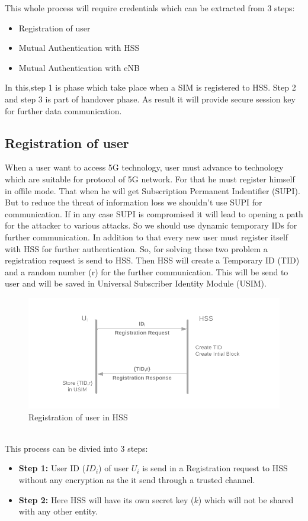 {    This whole process will require credentials which can be extracted from 3 steps:
    \begin{itemize}
        \item Registration of user
        \item Mutual Authentication with HSS
        \item Mutual Authentication with eNB
    \end{itemize}
    In this,step 1 is phase which take place when a SIM is registered to HSS.
    Step 2 and step 3 is part of handover phase. As result it will provide secure
    session key for further data communication.

}


\subsection{Registration of user}{
    When a user want to access 5G technology, user must advance to technology
    which are suitable for protocol of 5G network. For that he must register himself 
    in offile mode. That when he will get Subscription Permanent Indentifier (SUPI).
    But to reduce the threat of information loss we shouldn't use SUPI for communication.
    If in any case SUPI is compromised it will lead to opening a path for the attacker
    to various attacks. So we should use dynamic temporary IDs for further communication.
    In addition to that every new user must register itself with HSS for further authentication.
    So, for solving these two problem a registration request is send to HSS. Then HSS
    will create a Temporary ID (TID) and a random number (r) for the further communication. This will be send
    to user and will be saved in Universal Subscriber Identity Module (USIM).\\
    \begin{figure}[h]
        \centering
        \includegraphics[scale=0.5]{img/res.png}
        \caption{Registration of user in HSS}
    \end{figure}
    \\
    This process can be divied into 3 steps:
    \begin{itemize}
        \item \textbf{Step 1: } {
            User ID (\(ID_i\)) of user \(U_i\) is send in a Registration request to HSS without any encryption as the it send through a trusted channel.
        }
        \item \textbf{Step 2: } {
            Here HSS will have its own secret key (\(k\)) which will not be shared with any other entity.\\

}
\end{itemize}}
